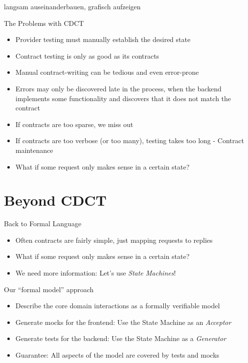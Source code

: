 
langsam auseinanderbauen, grafisch aufzeigen


\begin{frame}[fragile]{The Problems with CDCT}

\begin{itemize}[<+->]
\item Provider testing must manually establish the desired state
\item Contract testing is only as good as its contracts
\item Manual contract-writing can be tedious and even error-prone
\item Errors may only be discovered late in the process, when the backend implements some functionality and discovers that it does not match the contract
\item If contracts are too sparse, we miss out
\item If contracts are too verbose (or too many), testing takes too long
- Contract maintenance

\item What if some request only makes sense in a certain state?
\end{itemize}

\end{frame}

\part{Beyond CDCT}

\begin{frame}[fragile]{Back to Formal Language}
  \begin{itemize}[<+->]
  \item Often contracts are fairly simple, just mapping requests to replies
  \item What if some request only makes sense in a certain state?
  \item We need more information: Let's use \emph{State Machines}!
  \end{itemize}
\end{frame}


\begin{frame}[fragile]{Our ``formal model'' approach}

  \begin{itemize}[<+->]
  \item Describe the core domain interactions as a formally verifiable model
  \item Generate mocks for the frontend: Use the State Machine as an \emph{Acceptor}
  \item Generate tests for the backend: Use the State Machine as a \emph{Generator}
  \item Guarantee: All aspects of  the model are covered by tests and mocks
  \end{itemize}

\end{frame}

